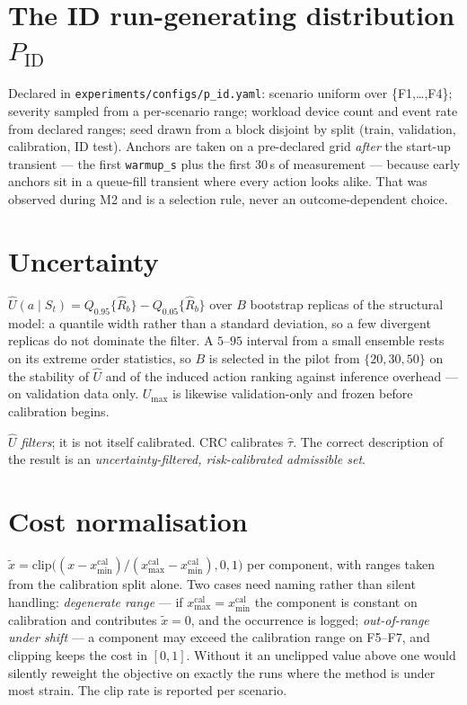 \documentclass[journal]{IEEEtran}
\begin{document}
\section{The ID run-generating distribution $P_{\mathrm{ID}}$}
\label{sec:pid}
Declared in \texttt{experiments/configs/p\_id.yaml}: scenario uniform over
\{F1,\dots,F4\}; severity sampled from a per-scenario range; workload device
count and event rate from declared ranges; seed drawn from a block disjoint by
split (train, validation, calibration, ID test). Anchors are taken on a
pre-declared grid \emph{after} the start-up transient --- the first
\texttt{warmup\_s} plus the first $30$\,s of measurement --- because early
anchors sit in a queue-fill transient where every action looks alike. That was
observed during M2 and is a selection rule, never an outcome-dependent choice.

\section{Uncertainty}
$\hat U(a\mid S_t)=Q_{0.95}\{\hat R_b\}-Q_{0.05}\{\hat R_b\}$ over $B$ bootstrap
replicas of the structural model: a quantile width rather than a standard
deviation, so a few divergent replicas do not dominate the filter. A $5$--$95$
interval from a small ensemble rests on its extreme order statistics, so $B$ is
selected in the pilot from $\{20,30,50\}$ on the stability of $\hat U$ and of the
induced action ranking against inference overhead --- on validation data only.
$U_{\max}$ is likewise validation-only and frozen before calibration begins.

$\hat U$ \emph{filters}; it is not itself calibrated. CRC calibrates $\hat\tau$.
The correct description of the result is an \emph{uncertainty-filtered,
risk-calibrated admissible set}.

\section{Cost normalisation}
$\tilde x=\mathrm{clip}\bigl((x-x^{\mathrm{cal}}_{\min})/
(x^{\mathrm{cal}}_{\max}-x^{\mathrm{cal}}_{\min}),0,1\bigr)$ per component, with
ranges taken from the calibration split alone. Two cases need naming rather than
silent handling:
\emph{degenerate range} --- if $x^{\mathrm{cal}}_{\max}=x^{\mathrm{cal}}_{\min}$
the component is constant on calibration and contributes $\tilde x=0$, and the
occurrence is logged;
\emph{out-of-range under shift} --- a component may exceed the calibration range
on F5--F7, and clipping keeps the cost in $[0,1]$. Without it an unclipped value
above one would silently reweight the objective on exactly the runs where the
method is under most strain. The clip rate is reported per scenario.
\end{document}
